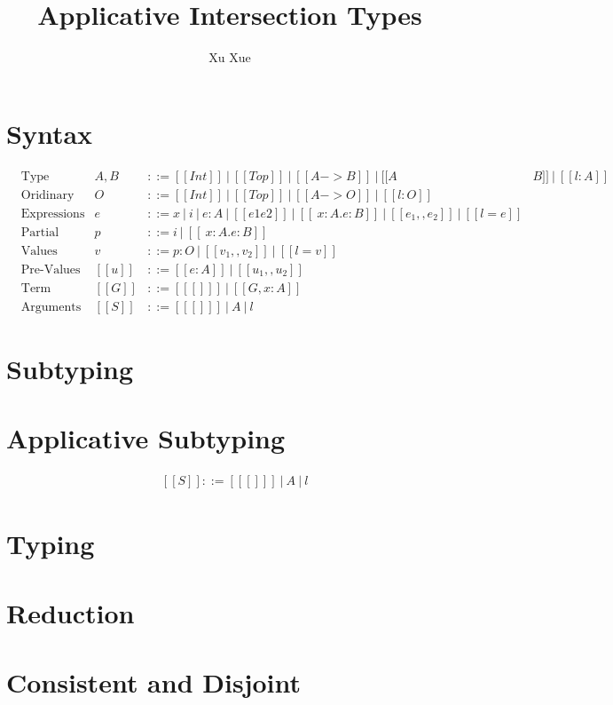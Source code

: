 \documentclass[a4paper]{article}
\title{Applicative Intersection Types}
\author{Xu Xue}
\begin{document}
\maketitle

\section{Syntax}

\begin{align*}
  &\text{Type} &A, B&::= [[Int]] ~|~ [[Top]] ~|~ [[A-> B]] ~|~ [[A&B]] ~|~ [[{ l : A}]]\\
  &\text{Oridinary Type} &O&::= [[Int]] ~|~ [[Top]] ~|~ [[A-> O]] ~|~ [[{ l : O }]]\\
  &\text{Expressions} &e    &::= x ~|~ i ~|~ e:A ~|~ [[e1 e2]] ~|~ [[ \ x : A .e : B]]~|~ [[e_1,,e_2]] ~|~ [[{l = e}]] \\
  &\text{Partial Values} &p   &::= i~|~ [[ \ x : A .e : B]] \\
  &\text{Values} &v   &::= p:O ~|~ [[v_1,,v_2]] ~|~ [[{l = v}]]\\
  &\text{Pre-Values} &[[u]] &::= [[e:A]]~|~ [[u_1,,u_2]]\\
  &\text{Term contexts} &[[G]] &::=  [[ [] ]] ~|~ [[ G, x:A ]] \\
  &\text{Arguments} &[[S]] &::= [[ [] ]] ~|~ A ~|~ l
\end{align*}

\section{Subtyping}

\ottdefnsTopLikeType

\ottdefnsOrdinaryType

\ottdefnsSplitType

\ottdefnsSubSubtyping

\ottdefnsAlgorithmicSubtyping

\section{Applicative Subtyping}

\begin{align*}
  &[[S]] ::= [[ [] ]] ~|~ A ~|~ l
\end{align*}

\ottdefnsAppsubBinary

\ottdefnsAppsub

\section{Typing}

\ottdefnsTyping

\section{Reduction}

\ottdefnsTypedReduction

\ottdefnsParallelApplication

\ottdefnsReduction

\section{Consistent and Disjoint}

\ottdefnsArgumentalType

\ottdefnsPrincipalType

\ottdefnsConsistent

\ottdefnsDisjoint
\end{document}
